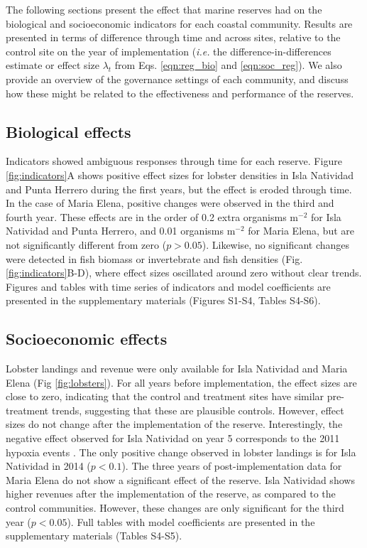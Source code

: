 \documentclass{frontiersSCNS}
\begin{document}
The following sections present the effect that marine reserves had on
the biological and socioeconomic indicators for each coastal community.
Results are presented in terms of difference through time and across
sites, relative to the control site on the year of implementation
(\emph{i.e.} the difference-in-differences estimate or effect size
\(\lambda_t\) from Eqs. \ref{eqn:reg_bio} and \ref{eqn:soc_reg}). We
also provide an overview of the governance settings of each community,
and discuss how these might be related to the effectiveness and
performance of the reserves.

\hypertarget{biological-effects}{%
\subsection{Biological effects}\label{biological-effects}}

Indicators showed ambiguous responses through time for each reserve.
Figure \ref{fig:indicators}A shows positive effect sizes for lobster
densities in Isla Natividad and Punta Herrero during the first years,
but the effect is eroded through time. In the case of Maria Elena,
positive changes were observed in the third and fourth year. These
effects are in the order of 0.2 extra organisms \(\mathrm{m}^{-2}\) for
Isla Natividad and Punta Herrero, and 0.01 organisms \(\mathrm{m}^{-2}\)
for Maria Elena, but are not significantly different from zero
(\(p > 0.05\)). Likewise, no significant changes were detected in fish
biomass or invertebrate and fish densities (Fig.
\ref{fig:indicators}B-D), where effect sizes oscillated around zero
without clear trends. Figures and tables with time series of indicators
and model coefficients are presented in the supplementary materials
(Figures S1-S4, Tables S4-S6).

\hypertarget{socioeconomic-effects}{%
\subsection{Socioeconomic effects}\label{socioeconomic-effects}}

Lobster landings and revenue were only available for Isla Natividad and
Maria Elena (Fig \ref{fig:lobsters}). For all years before
implementation, the effect sizes are close to zero, indicating that the
control and treatment sites have similar pre-treatment trends,
suggesting that these are plausible controls. However, effect sizes do
not change after the implementation of the reserve. Interestingly, the
negative effect observed for Isla Natividad on year 5 corresponds to the
2011 hypoxia events \citep{micheli_2012-EU}. The only positive change
observed in lobster landings is for Isla Natividad in 2014
(\(p < 0.1\)). The three years of post-implementation data for Maria
Elena do not show a significant effect of the reserve. Isla Natividad
shows higher revenues after the implementation of the reserve, as
compared to the control communities. However, these changes are only
significant for the third year (\(p < 0.05\)). Full tables with model
coefficients are presented in the supplementary materials (Tables
S4-S5).
\end{document}
